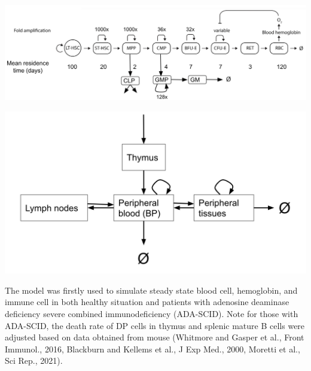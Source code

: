\documentclass[a0paper,portrait]{baposter}
\begin{document}
\begin{poster}
{\begin{minipage}[b]{0.55\linewidth}
\centering
\includegraphics[width=\textwidth]{../img/human_full_structure.png}
\end{minipage}
\hspace{0.5cm}
\begin{minipage}[b]{0.4\linewidth}
\centering
\includegraphics[width=\textwidth]{../img/human_naiveT.png}
\end{minipage}


The model was firstly used to simulate steady state blood cell, hemoglobin, and immune cell in both healthy situation and patients with adenosine deaminase deficiency severe combined immunodeficiency (ADA-SCID). Note for those with ADA-SCID, the death rate of DP cells in thymus and splenic mature B cells were adjusted based on data obtained from mouse (Whitmore and Gasper et al., Front Immunol., 2016, Blackburn and Kellems et al., J Exp Med., 2000, Moretti et al., Sci Rep., 2021). 

}
\end{poster}
\end{document}
